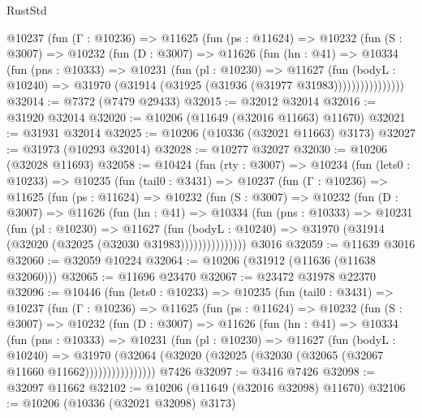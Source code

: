 \begin{lexlean}{RustStd}
\begin{coremodule}
          @10237
            (fun (Γ : @10236) =>
            @11625
              (fun (ps : @11624) =>
              @10232
                (fun (S : @3007) =>
                @10232
                  (fun (D : @3007) =>
                  @11626
                    (fun (hn : @41) =>
                    @10334
                      (fun (pns : @10333) =>
                      @10231
                        (fun (pl : @10230) =>
                        @11627
                          (fun (bodyL : @10240) =>
                          @31970 (@31914 (@31925 (@31936 (@31977 @31983))))))))))))))))
@32014 := @7372 (@7479 @29433)
@32015 := @32012 @32014
@32016 := @31920 @32014
@32020 := @10206 (@11649 (@32016 @11663) @11670)
@32021 := @31931 @32014
@32025 := @10206 (@10336 (@32021 @11663) @3173)
@32027 := @31973 (@10293 @32014)
@32028 := @10277 @32027
@32030 := @10206 (@32028 @11693)
@32058 := @10424
    (fun (rty : @3007) =>
    @10234
      (fun (lets0 : @10233) =>
      @10235
        (fun (tail0 : @3431) =>
        @10237
          (fun (Γ : @10236) =>
          @11625
            (fun (ps : @11624) =>
            @10232
              (fun (S : @3007) =>
              @10232
                (fun (D : @3007) =>
                @11626
                  (fun (hn : @41) =>
                  @10334
                    (fun (pns : @10333) =>
                    @10231
                      (fun (pl : @10230) =>
                      @11627
                        (fun (bodyL : @10240) =>
                        @31970 (@31914 (@32020 (@32025 (@32030 @31983)))))))))))))))
    @3016
@32059 := @11639 @3016
@32060 := @32059 @10224
@32064 := @10206 (@31912 (@11636 (@11638 @32060)))
@32065 := @11696 @23470
@32067 := @23472 @31978 @22370
@32096 := @10446
    (fun (lets0 : @10233) =>
    @10235
      (fun (tail0 : @3431) =>
      @10237
        (fun (Γ : @10236) =>
        @11625
          (fun (ps : @11624) =>
          @10232
            (fun (S : @3007) =>
            @10232
              (fun (D : @3007) =>
              @11626
                (fun (hn : @41) =>
                @10334
                  (fun (pns : @10333) =>
                  @10231
                    (fun (pl : @10230) =>
                    @11627
                      (fun (bodyL : @10240) =>
                      @31970
                        (@32064
                          (@32020 (@32025 (@32030 (@32065 (@32067 @11660 @11662))))))))))))))))
    @7426
@32097 := @3416 @7426
@32098 := @32097 @11662
@32102 := @10206 (@11649 (@32016 @32098) @11670)
@32106 := @10206 (@10336 (@32021 @32098) @3173)

\end{coremodule}
\end{lexlean}
